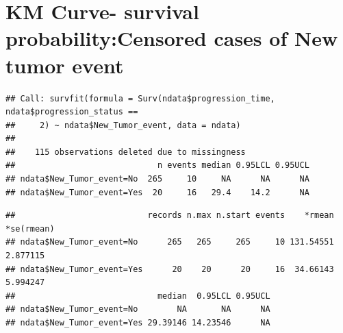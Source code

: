 \documentclass[
  11pt,
]{article}
\newenvironment{Shaded}{\begin{snugshade}}{\end{snugshade}}
\newcommand{\AttributeTok}[1]{\textcolor[rgb]{0.77,0.63,0.00}{#1}}
\newcommand{\DecValTok}[1]{\textcolor[rgb]{0.00,0.00,0.81}{#1}}
\newcommand{\FunctionTok}[1]{\textcolor[rgb]{0.00,0.00,0.00}{#1}}
\newcommand{\NormalTok}[1]{#1}
\newcommand{\OtherTok}[1]{\textcolor[rgb]{0.56,0.35,0.01}{#1}}
\newcommand{\SpecialCharTok}[1]{\textcolor[rgb]{0.00,0.00,0.00}{#1}}
\newcommand{\StringTok}[1]{\textcolor[rgb]{0.31,0.60,0.02}{#1}}
\begin{document}
\newpage
\section{KM Curve- survival probability:Censored cases of New tumor event}

\begin{Shaded}
\end{Shaded}

\begin{verbatim}
## Call: survfit(formula = Surv(ndata$progression_time, ndata$progression_status == 
##     2) ~ ndata$New_Tumor_event, data = ndata)
## 
##    115 observations deleted due to missingness 
##                             n events median 0.95LCL 0.95UCL
## ndata$New_Tumor_event=No  265     10     NA      NA      NA
## ndata$New_Tumor_event=Yes  20     16   29.4    14.2      NA
\end{verbatim}

\begin{Shaded}
\end{Shaded}

\begin{verbatim}
##                           records n.max n.start events    *rmean *se(rmean)
## ndata$New_Tumor_event=No      265   265     265     10 131.54551   2.877115
## ndata$New_Tumor_event=Yes      20    20      20     16  34.66143   5.994247
##                             median  0.95LCL 0.95UCL
## ndata$New_Tumor_event=No        NA       NA      NA
## ndata$New_Tumor_event=Yes 29.39146 14.23546      NA
\end{verbatim}
\end{document}
